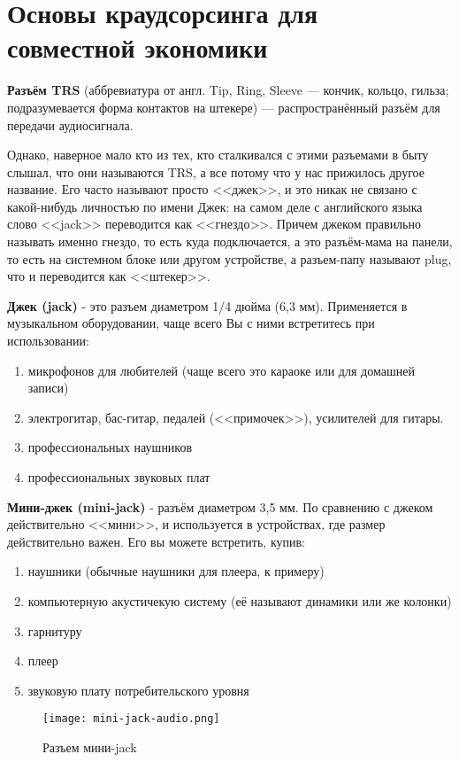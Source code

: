 \section{Основы краудсорсинга для совместной экономики}

\textbf{Разъём TRS} (аббревиатура от англ. Tip, Ring, Sleeve — кончик, кольцо, гильза; подразумевается форма контактов на штекере) — распространённый разъём для передачи аудиосигнала. \cite{wiki-trs}

Однако, наверное мало кто из тех, кто сталкивался с этими разъемами в быту слышал, что они называются TRS, а все потому что у нас прижилось другое название. Его часто называют просто <<джек>>, и это никак не связано с какой-нибудь личностью по имени Джек: на самом деле с английского языка слово <<jack>> переводится как <<гнездо>>. Причем джеком правильно называть именно гнездо, то есть куда подключается, а это разъём-мама на панели, то есть на системном блоке или другом устройстве, а разъем-папу называют plug, что и переводится как <<штекер>>. \cite{kkg-jack}

\textbf{Джек (jack)} - это разъем диаметром 1/4 дюйма (6,3 мм). Применяется в музыкальном оборудовании, чаще всего Вы с ними встретитесь при использовании:
\begin{enumerate}
\item микрофонов для любителей (чаще всего это караоке или для домашней записи)
\item электрогитар, бас-гитар, педалей (<<примочек>>), усилителей для гитары.
\item профессиональных наушников
\item профессиональных звуковых плат
\end{enumerate}

\textbf{Мини-джек (mini-jack)} - разъём диаметром 3,5 мм. По сравнению с джеком действительно <<мини>>, и используется в устройствах, где размер действительно важен. Его вы можете встретить, купив:
\begin{enumerate}
\item наушники (обычные наушники для плеера, к примеру)
\item компьютерную акустичекую систему (её называют динамики или же колонки) 
\item гарнитуру
\item плеер
\item звуковую плату потребительского уровня
\end{enumerate}

\begin{figure}[h]
  \centering
  \texttt{[image: mini-jack-audio.png]}
  \caption{Разъем мини-jack}
  \label{image:mini-jack-audio}
\end{figure}

